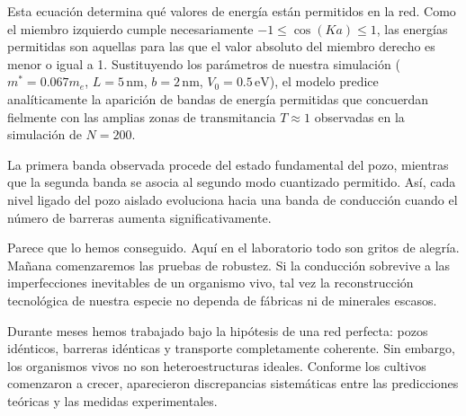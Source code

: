 \documentclass[a4paper,12pt]{article}
\begin{document}
Esta ecuación determina qué valores de energía están permitidos en la red. Como el miembro izquierdo cumple necesariamente \(-1\leq \cos(Ka)\leq 1\), las energías permitidas son aquellas para las que el valor absoluto del miembro derecho es menor o igual a 1. Sustituyendo los parámetros de nuestra simulación ($m^*=0.067m_e$, $L=5\,\mathrm{nm}$, $b=2\,\mathrm{nm}$, $V_0=0.5\,\mathrm{eV}$), el modelo predice analíticamente la aparición de bandas de energía permitidas que concuerdan fielmente con las amplias zonas de transmitancia $T \approx 1$ observadas en la simulación de $N=200$.

La primera banda observada procede del estado fundamental del pozo, mientras que la segunda banda se asocia al segundo modo cuantizado permitido. Así, cada nivel ligado del pozo aislado evoluciona hacia una banda de conducción cuando el número de barreras aumenta significativamente.

Parece que lo hemos conseguido. Aquí en el laboratorio todo son gritos de alegría. Mañana comenzaremos las pruebas de robustez. Si la conducción sobrevive a las imperfecciones inevitables de un organismo vivo, tal vez la reconstrucción tecnológica de nuestra especie no dependa de fábricas ni de minerales escasos.


Durante meses hemos trabajado bajo la hipótesis de una red perfecta: pozos idénticos, barreras idénticas y transporte completamente coherente. Sin embargo, los organismos vivos no son heteroestructuras ideales. Conforme los cultivos comenzaron a crecer, aparecieron discrepancias sistemáticas entre las predicciones teóricas y las medidas experimentales.
\end{document}
